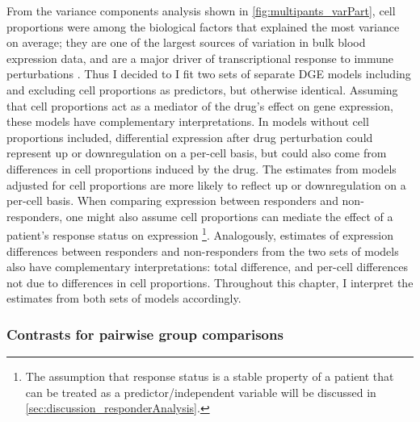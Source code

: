 From the variance components analysis shown in \cref{fig:multipants_varPart}, cell proportions were among the biological factors that explained the most variance on average;
they are one of the largest sources of variation in bulk blood expression data, 
and are a major driver of transcriptional response to immune perturbations \autocite{piasecka2018DistinctiveRolesAge}.
Thus I decided to I fit two sets of separate \gls{DGE} models including and excluding cell proportions as predictors, but otherwise identical.
Assuming that cell proportions act as a mediator of the drug's effect on gene expression, these models have complementary interpretations.
In models without cell proportions included, differential expression after drug perturbation could represent up or downregulation on a per-cell basis, 
but could also come from differences in cell proportions induced by the drug.
The estimates from models adjusted for cell proportions are more likely to reflect up or downregulation on a per-cell basis.
When comparing expression between responders and non-responders,
one might also assume cell proportions can mediate the effect of a patient's response status on expression%
\footnote{
    The assumption that response status is a stable property of a patient that can be treated as a predictor/independent variable will be discussed in \cref{sec:discussion_responderAnalysis}.
}.
Analogously, estimates of expression differences between responders and non-responders from the two sets of models 
also have complementary interpretations: total difference, and per-cell differences not due to differences in cell proportions.
Throughout this chapter, I interpret the estimates from both sets of models accordingly.


\subsubsection{Contrasts for pairwise group comparisons}

